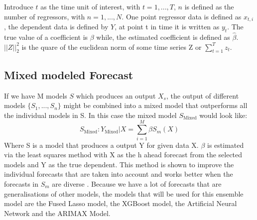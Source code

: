 Introduce $t$ as the time unit of interest, with $t = 1, ..., T$, $n$ is defined as the number of regressors, with $n = 1, ..., N$. One point regressor data is defined as $x_{t, i}$, the dependent data is defined by $Y$, at point t in time it is written as $y_{t}$. The true value of a coefficient is $\beta$ while, the estimated coefficient is defined as $\hat{\beta}$. $||Z||^2_2$ is the quare of the euclidean norm of some time series Z or $\sum_{t=1}^Tz_t$.






\subsection{Mixed modeled Forecast}
\label{subseq:mixed model}
If we have M models $S$ which produces an output $X_s$, the output of different models $\{S_1, ..., S_n\}$ might be combined into a mixed model that outperforms all the individual models in S. In this case the mixed model $S_{\text{Mixed}}$ would look like:
\begin{equation}
    S_{\text{Mixed}}: Y_{\text{Mixed}} | X = \sum\limits_{i=1}^M \beta S_m(X)
\end{equation}
Where S is a model that produces a output Y for given data X. $\beta$ is estimated via the least squares method with X as the h ahead forecast from the selected models and Y as the true dependent. This method is shown to improve the individual forecasts that are taken into account and works better when the forecasts in $S_m$ are diverse \citep{Yang2004CombiningResults}. Because we have a lot of forecasts that are generalisations of other models, the models that will be used for this ensemble model are the Fused Lasso model, the XGBoost model, the Artificial Neural Network and the ARIMAX Model.
 
